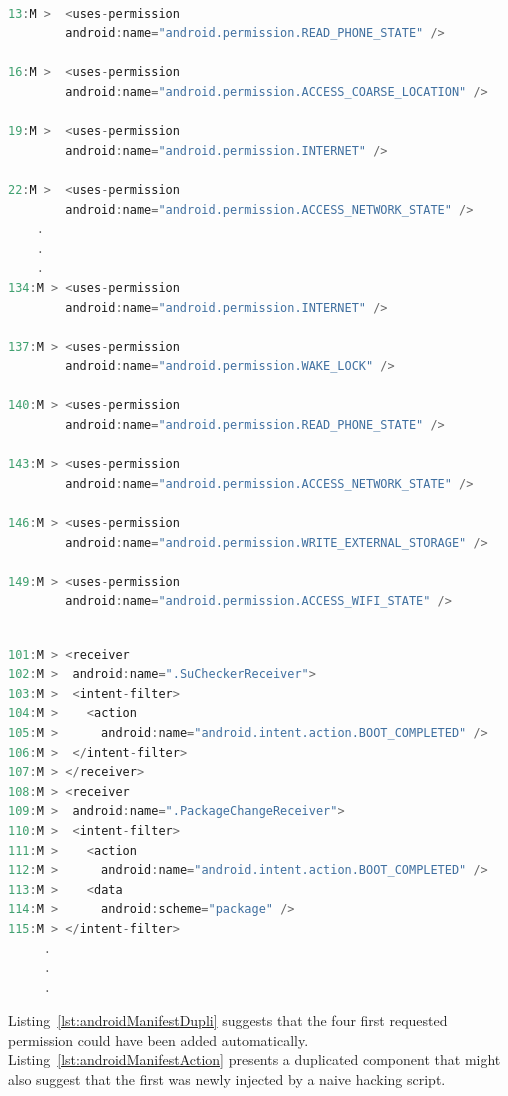 \begin{lstlisting}[caption={Example of duplicated permission from malicious version of app (com.ifeel.frogjump)}, language=Java,
    basicstyle=\fontsize{6}{5}\selectfont\ttfamily,
    label={lst:androidManifestDupli}]

13:M >  <uses-permission
        android:name="android.permission.READ_PHONE_STATE" />

16:M >  <uses-permission
        android:name="android.permission.ACCESS_COARSE_LOCATION" />

19:M >  <uses-permission
        android:name="android.permission.INTERNET" />

22:M >  <uses-permission
        android:name="android.permission.ACCESS_NETWORK_STATE" />
    .
    .
    .
134:M > <uses-permission
        android:name="android.permission.INTERNET" />

137:M > <uses-permission
        android:name="android.permission.WAKE_LOCK" />

140:M > <uses-permission
        android:name="android.permission.READ_PHONE_STATE" />

143:M > <uses-permission
        android:name="android.permission.ACCESS_NETWORK_STATE" />

146:M > <uses-permission
        android:name="android.permission.WRITE_EXTERNAL_STORAGE" />

149:M > <uses-permission
        android:name="android.permission.ACCESS_WIFI_STATE" />
\end{lstlisting}

\begin{lstlisting}[caption={An example of duplicated component capability from malicious version of app (com.koushikdutta.superuser)}, language=Java,
    basicstyle=\fontsize{6}{5}\selectfont\ttfamily,
    label={lst:androidManifestAction}]

101:M > <receiver
102:M >  android:name=".SuCheckerReceiver">
103:M >  <intent-filter>
104:M >    <action
105:M >      android:name="android.intent.action.BOOT_COMPLETED" />                 
106:M >  </intent-filter>
107:M > </receiver>
108:M > <receiver
109:M >  android:name=".PackageChangeReceiver">
110:M >  <intent-filter>
111:M >    <action
112:M >      android:name="android.intent.action.BOOT_COMPLETED" />
113:M >    <data
114:M >      android:scheme="package" />
115:M > </intent-filter>
     .
     .
     .
\end{lstlisting}

Listing~\ref{lst:androidManifestDupli} suggests that the four first requested permission could have been added automatically. Listing~\ref{lst:androidManifestAction} presents a duplicated component that might also suggest that the first was newly injected by a naive hacking script.


